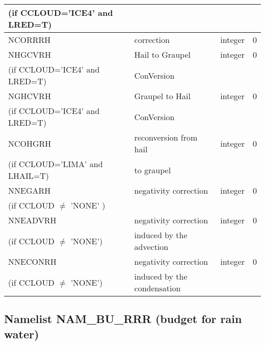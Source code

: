 \begin{longtable} {|p{}|p{}|>{\centering}p{}|p{}<{\centering}|}
(if CCLOUD='ICE4' and LRED=T) & &   &  \\\hline
NCORRRH  &  correction & integer  &  0 \index{NCORRRH!\innam{NAM\_BU\_RRH}}\\\hline
NHGCVRH  & Hail to Graupel  & integer  &  0 \index{NHGCVRH!\innam{NAM\_BU\_RRH}}\\ \nopagebreak
(if CCLOUD='ICE4' and LRED=T) & ConVersion  &   &  \\\hline
NGHCVRH  & Graupel to Hail  & integer  &  0 \index{NGHCVRH!\innam{NAM\_BU\_RRH}}\\ \nopagebreak
(if CCLOUD='ICE4' and LRED=T) & ConVersion  &   &  \\\hline
NCOHGRH  & reconversion from hail  & integer  &  0 \index{NCOHGRH!\innam{NAM\_BU\_RRH}}\\ \nopagebreak
(if CCLOUD='LIMA' and LHAIL=T) &to graupel  &   &  \\\hline
NNEGARH   & negativity correction & integer  &  0 \index{NNEGARH!\innam{NAM\_BU\_RRH}}\\ \nopagebreak
(if CCLOUD $\neq$ 'NONE' )& &   &  \\\hline
NNEADVRH  & negativity correction  & integer  &  0 \index{NNEADVRH!\innam{NAM\_BU\_RRH}}\\ \nopagebreak
(if CCLOUD $\neq$ 'NONE') & induced by the advection&   &  \\\hline
NNECONRH  &negativity correction    & integer  &  0 \index{NNECONRH!\innam{NAM\_BU\_RRH}}\\ \nopagebreak
(if CCLOUD $\neq$ 'NONE') &induced by the condensation &   &  \\\hline
\end{longtable}

\subsection{Namelist NAM\_BU\_RRR (budget for rain water)}

